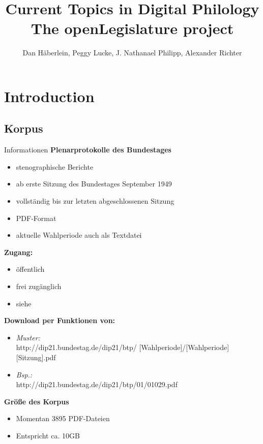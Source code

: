 \documentclass[11pt, a4paper]{beamer}
\author{Dan Häberlein, Peggy Lucke, J. Nathanael Philipp, Alexander Richter}
\title[The openLegislature project]{Current Topics in Digital Philology\\The openLegislature project}
\date{}
\institute{Universität Leipzig}
\begin{document}
\section{}
\begin{frame}
\titlepage
\end{frame}

 {
}


\section{Introduction}
\subsection{Korpus}
\begin{frame}{Informationen}
\textbf{Plenarprotokolle des Bundestages}
\begin{itemize}
\item stenographische Berichte
\item ab erste Sitzung des Bundestages September 1949
\item vollständig bis zur letzten abgeschlossenen Sitzung
\item PDF-Format
\item aktuelle Wahlperiode auch als Textdatei
\end{itemize}
\end{frame}

\begin{frame}
\textbf{Zugang:}
\begin{itemize}
\item öffentlich
\item frei zugänglich
\item siehe \cite{bundestag} \\[1em]
\end{itemize}
\textbf{Download per Funktionen von:}
\begin{itemize}
\item \textit{Muster:}\\
http://dip21.bundestag.de/dip21/btp/ [Wahlperiode]/[Wahlperiode][Sitzung].pdf
\item \textit{Bsp.:}\\ http://dip21.bundestag.de/dip21/btp/01/01029.pdf\\[1em]
\end{itemize}
\textbf{Größe des Korpus}
\begin{itemize}
\item Momentan 3895 PDF-Dateien
\item Entspricht ca. 10GB
\end{itemize}
\end{frame}
\end{document}
